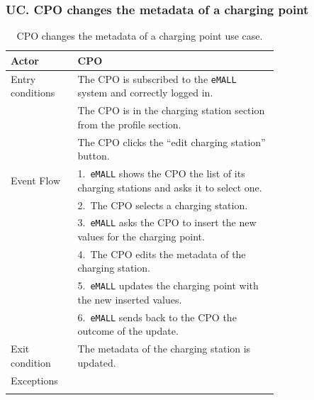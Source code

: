 \subsubsection*{UC\cuc . CPO changes the metadata of a charging point}
\begin{center}
    \begin{longtable}{lp{0.75\linewidth}}
        \hline
        Actor            & CPO                                                                                  \\
        \hline
        Entry conditions & The CPO is subscribed to the \verb|eMALL| system and correctly logged in.                   \\
        & The CPO is in the charging station section from the profile section.                 \\
        & The CPO clicks the “edit charging station” button.                                   \\
        \hline
        Event Flow       & 1.\ \verb|eMALL| shows the CPO the list of its charging stations and asks it to select one. \\
        & 2.\ The CPO selects a charging station.                                              \\
        & 3.\ \verb|eMALL| asks the CPO to insert the new values for the charging point.              \\
        & 4.\ The CPO edits the metadata of the charging station.                              \\
        & 5.\ \verb|eMALL| updates the charging point with the new inserted values.                   \\
        & 6.\ \verb|eMALL| sends back to the CPO the outcome of the update.                           \\
        \hline
        Exit condition   & The metadata of the charging station is updated.                                     \\
        \hline
        Exceptions       &                                                                                      \\
        \hline
        \caption{CPO changes the metadata of a charging point use case.}
        \label{tab: CPO_updates_charging_point_use_case}
    \end{longtable}


\end{center}
